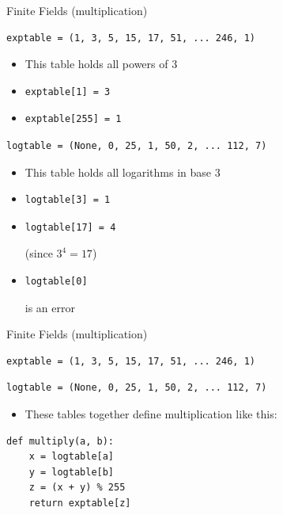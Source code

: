 \documentclass[]{prosper}
\begin{document}
\begin{slide}{Finite Fields (multiplication)}
\begin{verbatim}exptable = (1, 3, 5, 15, 17, 51, ... 246, 1)\end{verbatim}
\begin{itemize}
    \item This table holds all powers of 3
    \item \begin{verbatim}exptable[1] = 3\end{verbatim}
    \item \begin{verbatim}exptable[255] = 1\end{verbatim}
\end{itemize}
\begin{verbatim}logtable = (None, 0, 25, 1, 50, 2, ... 112, 7)\end{verbatim}
\begin{itemize}
    \item This table holds all logarithms in base 3
    \item \begin{verbatim}logtable[3] = 1\end{verbatim}
    \item \begin{verbatim}logtable[17] = 4\end{verbatim} (since $3^4 = 17$)
    \item \begin{verbatim}logtable[0]\end{verbatim} is an error
\end{itemize}
\end{slide}

\begin{slide}{Finite Fields (multiplication)}
\begin{verbatim}exptable = (1, 3, 5, 15, 17, 51, ... 246, 1)\end{verbatim}
\begin{verbatim}logtable = (None, 0, 25, 1, 50, 2, ... 112, 7)\end{verbatim}
\begin{itemize}
    \item These tables together define multiplication like this:
\end{itemize}
\begin{verbatim}
def multiply(a, b):
    x = logtable[a]
    y = logtable[b]
    z = (x + y) % 255
    return exptable[z]
\end{verbatim}
\end{slide}
\end{document}
